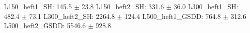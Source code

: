L150_heft1_SH: 145.5 $\pm$ 23.8
L150_heft2_SH: 331.6 $\pm$ 36.0
L300_heft1_SH: 482.4 $\pm$ 73.1
L300_heft2_SH: 2264.8 $\pm$ 124.4
L500_heft1_GSDD: 764.8 $\pm$ 312.6
L500_heft2_GSDD: 5546.6 $\pm$ 928.8
